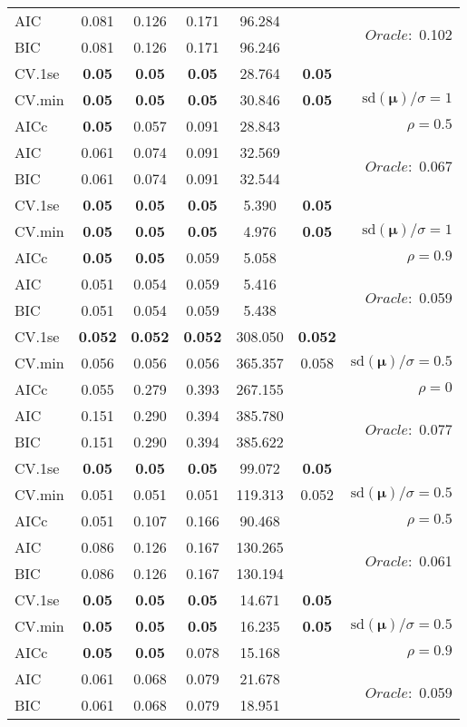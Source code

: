 \begin{table}
\begin{center}
\begin{tabular}{l*{5}{c}|r}
AIC & 0.081 & 0.126 & 0.171 & 96.284 & &  \multirow{2}{*}{$Oracle: $ 0.102} \\
BIC & 0.081 & 0.126 & 0.171 & 96.246 & &  \\
 \hline 
CV.1se & {\bf 0.05} & {\bf 0.05} & {\bf 0.05} & 28.764 & {\bf 0.05} & \\
CV.min & {\bf 0.05} & {\bf 0.05} & {\bf 0.05} & 30.846 & {\bf 0.05} &  $\mathrm{sd}(\mathbf{\mu})/\sigma=1$ \\
AICc & {\bf 0.05} & 0.057 & 0.091 & 28.843 & & $\rho=0.5$ \\
AIC & 0.061 & 0.074 & 0.091 & 32.569 & &  \multirow{2}{*}{$Oracle: $ 0.067} \\
BIC & 0.061 & 0.074 & 0.091 & 32.544 & &  \\
 \hline 
CV.1se & {\bf 0.05} & {\bf 0.05} & {\bf 0.05} & 5.390 & {\bf 0.05} & \\
CV.min & {\bf 0.05} & {\bf 0.05} & {\bf 0.05} & 4.976 & {\bf 0.05} &  $\mathrm{sd}(\mathbf{\mu})/\sigma=1$ \\
AICc & {\bf 0.05} & {\bf 0.05} & 0.059 & 5.058 & & $\rho=0.9$ \\
AIC & 0.051 & 0.054 & 0.059 & 5.416 & &  \multirow{2}{*}{$Oracle: $ 0.059} \\
BIC & 0.051 & 0.054 & 0.059 & 5.438 & &  \\
 \hline 
CV.1se & {\bf 0.052} & {\bf 0.052} & {\bf 0.052} & 308.050 & {\bf 0.052} & \\
CV.min & 0.056 & 0.056 & 0.056 & 365.357 & 0.058 &  $\mathrm{sd}(\mathbf{\mu})/\sigma=0.5$ \\
AICc & 0.055 & 0.279 & 0.393 & 267.155 & & $\rho=0$ \\
AIC & 0.151 & 0.290 & 0.394 & 385.780 & &  \multirow{2}{*}{$Oracle: $ 0.077} \\
BIC & 0.151 & 0.290 & 0.394 & 385.622 & &  \\
 \hline 
CV.1se & {\bf 0.05} & {\bf 0.05} & {\bf 0.05} & 99.072 & {\bf 0.05} & \\
CV.min & 0.051 & 0.051 & 0.051 & 119.313 & 0.052 &  $\mathrm{sd}(\mathbf{\mu})/\sigma=0.5$ \\
AICc & 0.051 & 0.107 & 0.166 & 90.468 & & $\rho=0.5$ \\
AIC & 0.086 & 0.126 & 0.167 & 130.265 & &  \multirow{2}{*}{$Oracle: $ 0.061} \\
BIC & 0.086 & 0.126 & 0.167 & 130.194 & &  \\
 \hline 
CV.1se & {\bf 0.05} & {\bf 0.05} & {\bf 0.05} & 14.671 & {\bf 0.05} & \\
CV.min & {\bf 0.05} & {\bf 0.05} & {\bf 0.05} & 16.235 & {\bf 0.05} &  $\mathrm{sd}(\mathbf{\mu})/\sigma=0.5$ \\
AICc & {\bf 0.05} & {\bf 0.05} & 0.078 & 15.168 & & $\rho=0.9$ \\
AIC & 0.061 & 0.068 & 0.079 & 21.678 & &  \multirow{2}{*}{$Oracle: $ 0.059} \\
BIC & 0.061 & 0.068 & 0.079 & 18.951 & &  \\
 \hline 
\end{tabular}
\end{center}
\vspace{-1cm}
\end{table}
